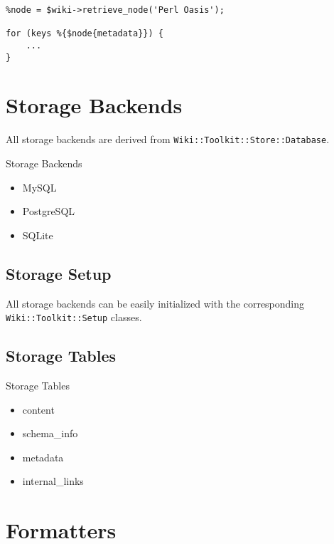 \begin{lstlisting}
%node = $wiki->retrieve_node('Perl Oasis');

for (keys %{$node{metadata}}) {
    ...
}
\end{lstlisting}

\section{Storage Backends}

All storage backends are derived from \verb+Wiki::Toolkit::Store::Database+.

\begin{frame}{Storage Backends}
 \begin{itemize}
  \item MySQL
  \item PostgreSQL
  \item SQLite
 \end{itemize}
\end{frame}

\subsection{Storage Setup}


All storage backends can be easily initialized with the corresponding
\verb+Wiki::Toolkit::Setup+ classes.



\subsection{Storage Tables}

\begin{frame}{Storage Tables}
 \begin{itemize}
  \item content
  \item schema\_info
  \item metadata
  \item internal\_links
 \end{itemize}
\end{frame}

\section{Formatters}


